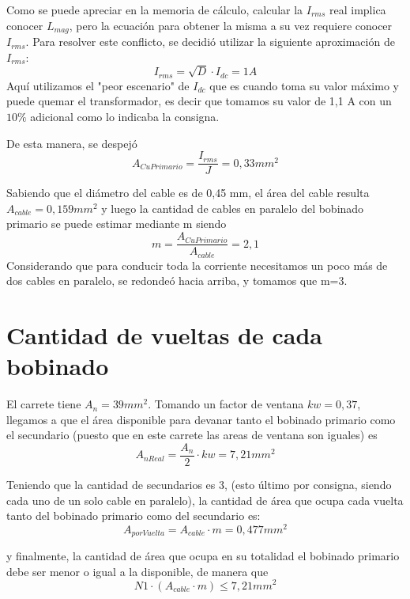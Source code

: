 \documentclass{article}
\begin{document}
Como se puede apreciar en la memoria de cálculo, calcular la $ I_{rms} $ real implica conocer $L_{mag}$, pero la ecuación para obtener la misma a su vez requiere conocer $ I_{rms} $. Para resolver este conflicto, se decidió utilizar la siguiente aproximación de $ I_{rms} $:
\begin{equation}
    I_{rms} = \sqrt{D} \cdot I_{dc} = 1 A
\end{equation}
Aquí utilizamos el "peor escenario" de $ I_{dc} $ que es cuando toma su valor máximo y puede quemar el transformador, es decir que tomamos su valor de 1,1 A con un $ 10 \% $ adicional como lo indicaba la consigna.

De esta manera, se despejó
\begin{equation}
    A_{CuPrimario} = \frac{I_{rms}}{J} = 0,33 mm^2
\end{equation}

Sabiendo que el diámetro del cable es de 0,45 mm, el área del cable resulta $ A_{cable} = 0,159 mm^2 $ y luego la cantidad de cables en paralelo del bobinado primario se puede estimar mediante m siendo
\begin{equation}
    m = \frac{A_{CuPrimario}}{A_{cable}} = 2,1
    \label{eq:CablesParalelo}
\end{equation}
Considerando que para conducir toda la corriente necesitamos un poco más de dos cables en paralelo, se redondeó hacia arriba, y tomamos que m=3.

\section{Cantidad de vueltas de cada bobinado}
El carrete tiene $ A_n = 39 mm^2 $. Tomando un factor de ventana $kw=0,37$,  llegamos a que el área disponible para devanar tanto el bobinado primario como el secundario (puesto que en este carrete las areas de ventana son iguales) es 
\begin{equation}
    A_{nReal}=\frac{A_n}{2} \cdot kw = 7,21 mm^2
\end{equation}

Teniendo que la cantidad de secundarios es 3, (esto último por consigna, siendo cada uno de un solo cable en paralelo), la cantidad de área que ocupa cada vuelta tanto del bobinado primario como del secundario es:
\begin{equation}
    A_{porVuelta} = A_{cable} \cdot m = 0,477 mm^2
\end{equation}

y finalmente, la cantidad de área que ocupa en su totalidad el bobinado primario debe ser menor o igual a la disponible, de manera que
\begin{equation}
    N1 \cdot (A_{cable} \cdot m) \le 7,21 mm^2  
    \label{eq:AreaBobinadoPrimario}
\end{equation}
\end{document}
